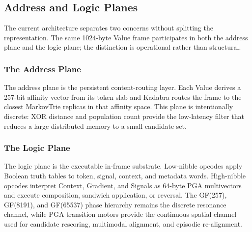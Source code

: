 \subsection{Address and Logic Planes}
\label{sec:dual_architecture}

The current architecture separates two concerns without splitting the
representation.  The same 1024-byte Value frame participates in both the
address plane and the logic plane; the distinction is operational rather
than structural.

\subsubsection{The Address Plane}

The address plane is the persistent content-routing layer.  Each Value
derives a 257-bit affinity vector from its token slab and Kadabra routes
the frame to the closest MarkovTrie replicas in that affinity space.
This plane is intentionally discrete: XOR distance and population count
provide the low-latency filter that reduces a large distributed memory
to a small candidate set.

\subsubsection{The Logic Plane}

The logic plane is the executable in-frame substrate.  Low-nibble
opcodes apply Boolean truth tables to token, signal, context, and
metadata words.  High-nibble opcodes interpret Context, Gradient, and
Signals as 64-byte PGA multivectors and execute composition, sandwich
application, or reversal.  The GF(257), GF(8191), and GF(65537) phase
hierarchy remains the discrete resonance channel, while PGA transition
motors provide the continuous spatial channel used for candidate
rescoring, multimodal alignment, and episodic re-alignment.
